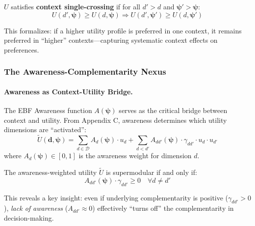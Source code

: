 \begin{definition}
\label{def:context-scp}
$U$ satisfies \textbf{context single-crossing} if for all $d' > d$ and 
$\boldsymbol{\psi}' > \boldsymbol{\psi}$:
\begin{equation}
U(d', \boldsymbol{\psi}) \geq U(d, \boldsymbol{\psi}) \Rightarrow 
U(d', \boldsymbol{\psi}') \geq U(d, \boldsymbol{\psi}')
\end{equation}
\end{definition}

This formalizes: if a higher utility profile is preferred in one context, it remains 
preferred in ``higher'' contexts---capturing systematic context effects on preferences.

\subsubsection{The Awareness-Complementarity Nexus}

\paragraph{Awareness as Context-Utility Bridge.}

The EBF Awareness function $A(\boldsymbol{\psi})$ serves as the critical bridge 
between context and utility. From Appendix C, awareness determines which utility 
dimensions are ``activated'':
\begin{equation}
\tilde{U}(\mathbf{d}, \boldsymbol{\psi}) = \sum_{d \in \mathcal{D}} 
A_d(\boldsymbol{\psi}) \cdot u_d + 
\sum_{d < d'} A_{dd'}(\boldsymbol{\psi}) \cdot \gamma_{dd'} \cdot u_d \cdot u_{d'}
\label{eq:awareness-utility}
\end{equation}
where $A_d(\boldsymbol{\psi}) \in [0,1]$ is the awareness weight for dimension $d$.

\begin{proposition}
\label{prop:awareness-super}
The awareness-weighted utility $\tilde{U}$ is supermodular if and only if:
\begin{equation}
A_{dd'}(\boldsymbol{\psi}) \cdot \gamma_{dd'} \geq 0 \quad \forall d \neq d'
\end{equation}
\end{proposition}

This reveals a key insight: even if underlying complementarity is positive 
($\gamma_{dd'} > 0$), \emph{lack of awareness} ($A_{dd'} \approx 0$) effectively 
``turns off'' the complementarity in decision-making.

